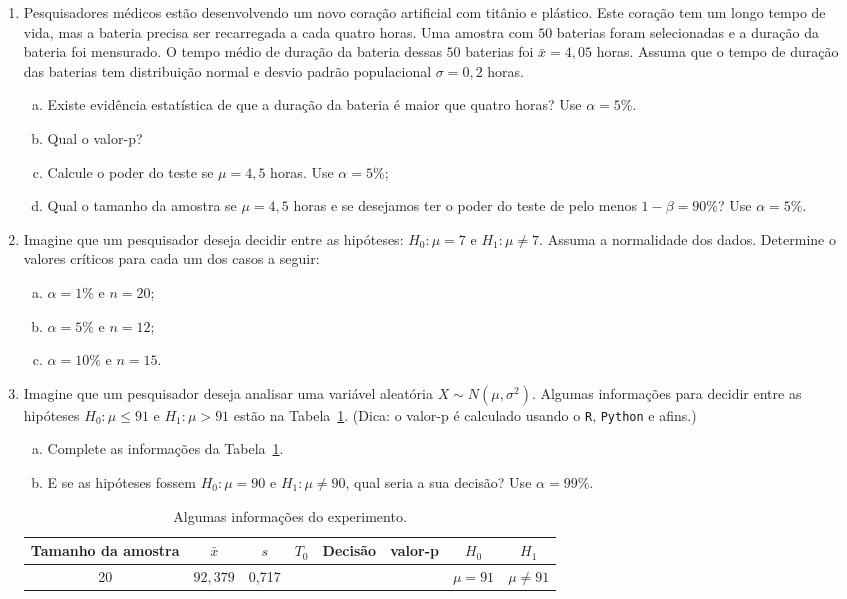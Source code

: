 \documentclass[12pt, a4paper]{article}
\begin{document}
\begin{enumerate}
	\item Pesquisadores médicos estão desenvolvendo um novo coração artificial com titânio e plástico. Este coração tem um longo tempo de vida, mas a bateria precisa ser recarregada a cada quatro horas. Uma amostra com $50$ baterias foram selecionadas e a duração da bateria foi mensurado. O tempo médio de duração da bateria dessas $50$ baterias foi $\bar{x} = 4,05$ horas. Assuma que o tempo de duração das baterias tem distribuição normal e desvio padrão populacional $\sigma=0,2$ horas. 
	\begin{enumerate}[(a)]
		\item Existe evidência estatística de que a duração da bateria é maior que quatro horas? Use $\alpha=5\%$.
		\item Qual o valor-p?
		\item Calcule o poder do teste se $\mu=4,5$ horas. Use $\alpha=5\%$;
		\item Qual o tamanho da amostra se $\mu=4,5$ horas e se desejamos ter o poder do teste de pelo menos $1-\beta = 90\%$? Use $\alpha=5\%$.
	\end{enumerate}

	\item Imagine que um pesquisador deseja decidir entre as hipóteses: $H_0: \mu = 7$ e $H_1: \mu \neq 7$. Assuma a normalidade dos dados. Determine o valores críticos para cada um dos casos a seguir:
	\begin{enumerate}[(a)]
		\item $\alpha=1\%$ e $n=20$;
		\item $\alpha=5\%$ e $n=12$;
		\item $\alpha=10\%$ e $n=15$.
	\end{enumerate}

	\item Imagine que um pesquisador deseja analisar uma variável aleatória $X \sim N(\mu, \sigma^2)$. Algumas informações para decidir entre as hipóteses $H_0: \mu \leq 91$ e $H_1: \mu > 91$ estão na Tabela~\ref{tab:s2-unknown-table}. (Dica: o valor-p é calculado usando o \texttt{R}, \texttt{Python} e afins.)
	\begin{enumerate}[(a)]
		\item Complete as informações da Tabela~\ref{tab:s2-unknown-table}.
		\item E se as hipóteses fossem $H_0:\mu = 90$ e $H_1: \mu \neq 90$, qual seria a sua decisão? Use $\alpha=99\%$.
	\end{enumerate}
	\begin{table}[htbp]
		\centering
		\begin{tabular}{c|c|c|c|c|c|c|c}
			\toprule[0.05cm]
			Tamanho da amostra & $\bar{x}$ & $s$ & $T_0$ & Decisão & valor-p & $H_0$ & $H_1$\\ \midrule[0.025cm]
			20 & $92,379$ & 0,717 & & & & $\mu = 91$ & $\mu \neq 91$\\
			\bottomrule[0.05cm]
		\end{tabular}
		\caption{Algumas informações do experimento.}
		\label{tab:s2-unknown-table}
	\end{table}


\end{enumerate}
\end{document}
